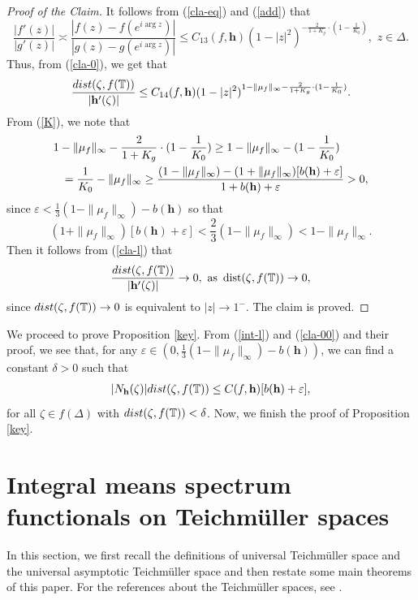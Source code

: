 \documentclass[11pt]{amsart}
\theoremstyle{remark}
\theoremstyle{claim}
\theoremstyle{definition}
\theoremstyle{problem}
\theoremstyle{conjecture}
\theoremstyle{question}
\numberwithin{equation}{section}
\begin{document}
\begin{proof}[Proof of the Claim]
It follows from (\ref{cla-eq}) and (\ref{add}) that
\begin{equation}
\frac{|f'(z)|}{|g'(z)|} \asymp \frac{ |f(z)-f(e^{i\arg{z}})|}{|g(z)-g(e^{i\arg{z}})|}\leq C_{13}(f, \mathbf{h}) (1-|z|^2)^{-\frac{2}{1+K_g} \cdot (1-\frac{1}{{K_0}})},\,\, z\in \Delta. \nonumber
\end{equation}
Thus, from (\ref{cla-0}), we get that
\begin{eqnarray}\label{cla-l}
\frac{{\textup{dist}}(\zeta, f(\mathbb{T}))}{|\mathbf{h}'(\zeta)|}  \leq  C_{14}(f, \mathbf{h}) (1-|z|^2)^{1-\|\mu_f\|_{\infty}-\frac{2}{1+K_g}\cdot (1-\frac{1}{K_0})}.
\end{eqnarray}
From (\ref{K}), we note that
\begin{eqnarray}\lefteqn{1-\|\mu_f\|_{\infty}-\frac{2}{1+K_g}\cdot (1-\frac{1}{{K_0}}) \geq 1-\|\mu_f\|_{\infty}-(1-\frac{1}{{K_0}}) }\nonumber \\
&&= \frac{1}{{K_0}}-\|\mu_f\|_{\infty}  \geq  \frac{(1-\|\mu_f\|_{\infty})-(1+\|\mu_f\|_{\infty})[b(\mathbf{h})+\varepsilon]}{1+b(\mathbf{h})+\varepsilon}>0,\nonumber  \end{eqnarray}
since $\varepsilon< \frac{1}{3}(1-\|\mu_f\|_{\infty})-b(\mathbf{h})$ so that
$$(1+\|\mu_f\|_{\infty})[b(\mathbf{h})+\varepsilon]<\frac{2}{3}(1-\|\mu_f\|_{\infty})<1-\|\mu_f\|_{\infty}.$$
Then it follows from (\ref{cla-l}) that
\begin{equation}
\frac{{\textup{dist}}(\zeta, f(\mathbb{T}))}{|\mathbf{h}'(\zeta)|} \rightarrow 0, \,\, {\text {as}}\,\,\,  {\text {dist}}(\zeta, f(\mathbb{T})) \rightarrow 0, \nonumber
\end{equation}
since ${\textup{dist}}(\zeta, f(\mathbb{T})) \rightarrow 0$ is equivalent to $|z| \rightarrow 1^{-}$.  The claim is proved.
 \end{proof}

We proceed to prove Proposition \ref{key}.  From (\ref{int-l}) and (\ref{cla-00}) and their proof, we see that, for any $\varepsilon\in (0,  \frac{1}{3}(1-\|\mu_f\|_{\infty})-b(\mathbf{h}))$,  we can find a constant  $\delta>0$ such that
\begin{eqnarray}
|N_{\mathbf{h}}(\zeta)|{\textup{dist}}(\zeta, f(\mathbb{T})) \leq C(f, \mathbf{h})[b(\mathbf{h})+\varepsilon],\nonumber
\end{eqnarray}
for all $\zeta\in f(\Delta)$ with ${\textup{dist}}(\zeta, f(\mathbb{T}))<\delta$.  Now, we finish the proof of  Proposition \ref{key}.

\section{{\bf Integral means spectrum functionals on Teichm\"uller spaces}}
 In this section, we first recall the definitions of universal Teichm\"uller space and the  universal  asymptotic Teichm\"uller space and then restate some main theorems of this paper. For the references about the Teichm\"uller spaces, see \cite{GN, EGN-1, EMS, EGN-2, L, Zhur, AG1}.
\end{document}
